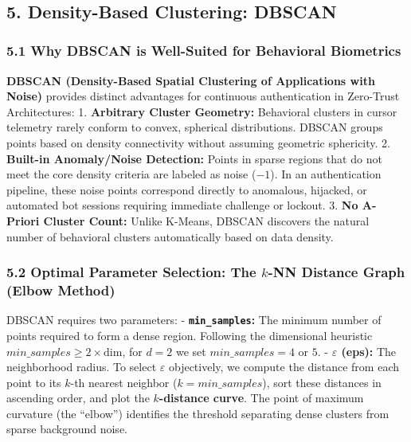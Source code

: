 \documentclass[11pt]{article}
\begin{document}
    \begin{center}
    \end{center}
    { \hspace*{\fill} \\}
    
    \subsection{5. Density-Based Clustering:
DBSCAN}\label{density-based-clustering-dbscan}

\subsubsection{5.1 Why DBSCAN is Well-Suited for Behavioral
Biometrics}\label{why-dbscan-is-well-suited-for-behavioral-biometrics}

\textbf{DBSCAN (Density-Based Spatial Clustering of Applications with
Noise)} provides distinct advantages for continuous authentication in
Zero-Trust Architectures: 1. \textbf{Arbitrary Cluster Geometry:}
Behavioral clusters in cursor telemetry rarely conform to convex,
spherical distributions. DBSCAN groups points based on density
connectivity without assuming geometric sphericity. 2. \textbf{Built-in
Anomaly/Noise Detection:} Points in sparse regions that do not meet the
core density criteria are labeled as noise (\(-1\)). In an
authentication pipeline, these noise points correspond directly to
anomalous, hijacked, or automated bot sessions requiring immediate
challenge or lockout. 3. \textbf{No A-Priori Cluster Count:} Unlike
K-Means, DBSCAN discovers the natural number of behavioral clusters
automatically based on data density.

\subsubsection{\texorpdfstring{5.2 Optimal Parameter Selection: The
\(k\)-NN Distance Graph (Elbow
Method)}{5.2 Optimal Parameter Selection: The k-NN Distance Graph (Elbow Method)}}\label{optimal-parameter-selection-the-k-nn-distance-graph-elbow-method}

DBSCAN requires two parameters: - \textbf{\texttt{min\_samples}:} The
minimum number of points required to form a dense region. Following the
dimensional heuristic \(min\_samples \ge 2 \times \text{dim}\), for
\(d = 2\) we set \(min\_samples = 4\) or \(5\). -
\textbf{\(\varepsilon\) (eps):} The neighborhood radius. To select
\(\varepsilon\) objectively, we compute the distance from each point to
its \(k\)-th nearest neighbor (\(k = min\_samples\)), sort these
distances in ascending order, and plot the \textbf{\(k\)-distance
curve}. The point of maximum curvature (the ``elbow'') identifies the
threshold separating dense clusters from sparse background noise.
\end{document}
